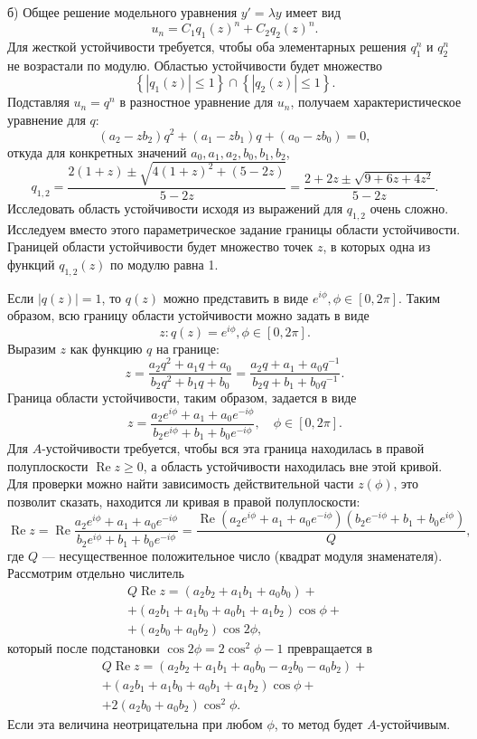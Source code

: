 \documentclass[12pt]{article}
\begin{document}
%
б) Общее решение модельного уравнения $y' = \lambda y$ имеет вид
\[
u_n = C_1 q_1(z)^n + C_2 q_2(z)^n.
\]
Для жесткой устойчивости требуется, чтобы оба элементарных решения $q_1^n$ и $q_2^n$ не возрастали по модулю. Областью устойчивости будет множество
\[
\left\{|q_1(z)| \leqslant 1\right\} \cap
\left\{|q_2(z)| \leqslant 1\right\}.
\]
Подставляя $u_n = q^n$ в разностное уравнение для $u_n$, получаем
характеристическое уравнение для $q$:
\[
(a_2 - z b_2) q^2 + (a_1 - z b_1) q + (a_0 - z b_0) = 0,
\]
откуда для конкретных значений $a_0, a_1, a_2, b_0, b_1, b_2$,
\[
q_{1,2} = \frac{2(1 + z) \pm \sqrt{4(1+z)^2 + (5-2z)}}{5 - 2z} = 
\frac{2 + 2z \pm \sqrt{9 + 6z + 4z^2}}{5 - 2z}.
\]
Исследовать область устойчивости исходя из выражений для $q_{1,2}$ очень сложно.
Исследуем вместо этого параметрическое задание границы области устойчивости.
Границей области устойчивости будет множество точек $z$, в которых одна из функций $q_{1,2}(z)$ по модулю равна 1.

Если $|q(z)| = 1$, то $q(z)$ можно представить в виде $e^{i \phi}, \phi \in [0, 2\pi]$. Таким образом, всю границу области устойчивости можно задать в виде
\[
z : q(z) = e^{i\phi}, \phi \in [0,2\pi].
\]
Выразим $z$ как функцию $q$ на границе:
\[
z = \frac{a_2 q^2 + a_1 q + a_0}{b_2 q^2 + b_1 q + b_0} = 
\frac{a_2 q + a_1 + a_0 q^{-1}}{b_2 q + b_1 + b_0 q^{-1}}.
\]
Граница области устойчивости, таким образом, задается в виде
\[
z = \frac{a_2 e^{i\phi} + a_1 + a_0 e^{-i\phi}}{b_2 e^{i\phi} + b_1 + b_0 e^{-i\phi}}, \quad \phi \in [0,2\pi].
\]
Для $A$-устойчивости требуется, чтобы вся эта граница находилась в правой полуплоскости $\operatorname{Re} z \geqslant 0$, а область устойчивости находилась вне этой кривой.
Для проверки можно найти зависимость действительной части $z(\phi)$, это позволит сказать, находится ли кривая в правой полуплоскости:
\[
\operatorname{Re} z = \operatorname{Re} \frac{a_2 e^{i\phi} + a_1 + a_0 e^{-i\phi}}{b_2 e^{i\phi} + b_1 + b_0 e^{-i\phi}} = 
\frac{\operatorname{Re} (a_2 e^{i\phi} + a_1 + a_0 e^{-i\phi})(b_2 e^{-i\phi} + b_1 + b_0 e^{i\phi})}{Q},
\]
где $Q$ --- несущественное положительное число (квадрат модуля знаменателя). 
Рассмотрим отдельно числитель
\begin{multline*}
Q \operatorname{Re} z = (a_2 b_2 + a_1 b_1 + a_0 b_0) + \\ + (a_2 b_1 + a_1 b_0 + a_0 b_1 + a_1 b_2) \cos \phi + \\ + (a_2 b_0 + a_0 b_2) \cos 2 \phi,
\end{multline*}
который после подстановки $\cos 2\phi = 2\cos^2 \phi - 1$ превращается в
\begin{multline*}
Q \operatorname{Re} z = (a_2 b_2 + a_1 b_1 + a_0 b_0 - a_2 b_0 - a_0 b_2) + \\ + (a_2 b_1 + a_1 b_0 + a_0 b_1 + a_1 b_2) \cos \phi + \\ + 2(a_2 b_0 + a_0 b_2) \cos^2 \phi.
\end{multline*}
Если эта величина неотрицательна при любом $\phi$, то метод будет $A$-устойчивым.
\end{document}
